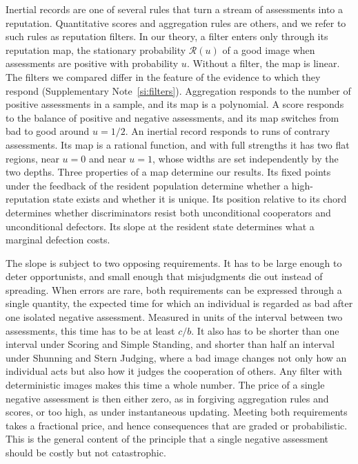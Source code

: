 \documentclass[10pt]{wlscirep}
\newcommand{\Rmap}{\mathscr{R}}            %
\theoremstyle{plain}
\theoremstyle{remark}
\begin{document}
Inertial records are one of several rules that turn a stream of assessments into a reputation. Quantitative scores and aggregation rules are others, and we refer to such rules as reputation filters. In our theory, a filter enters only through its reputation map, the stationary probability $\Rmap(u)$ of a good image when assessments are positive with probability $u$. Without a filter, the map is linear. The filters we compared differ in the feature of the evidence to which they respond (Supplementary Note~\ref{si:filters}). Aggregation responds to the number of positive assessments in a sample, and its map is a polynomial. A score responds to the balance of positive and negative assessments, and its map switches from bad to good around $u=1/2$. An inertial record responds to runs of contrary assessments. Its map is a rational function, and with full strengths it has two flat regions, near $u=0$ and near $u=1$, whose widths are set independently by the two depths. Three properties of a map determine our results. Its fixed points under the feedback of the resident population determine whether a high-reputation state exists and whether it is unique. Its position relative to its chord determines whether discriminators resist both unconditional cooperators and unconditional defectors. Its slope at the resident state determines what a marginal defection costs.

The slope is subject to two opposing requirements. It has to be large enough to deter opportunists, and small enough that misjudgments die out instead of spreading. When errors are rare, both requirements can be expressed through a single quantity, the expected time for which an individual is regarded as bad after one isolated negative assessment. Measured in units of the interval between two assessments, this time has to be at least $c/b$. It also has to be shorter than one interval under Scoring and Simple Standing, and shorter than half an interval under Shunning and Stern Judging, where a bad image changes not only how an individual acts but also how it judges the cooperation of others. Any filter with deterministic images makes this time a whole number. The price of a single negative assessment is then either zero, as in forgiving aggregation rules and scores, or too high, as under instantaneous updating. Meeting both requirements takes a fractional price, and hence consequences that are graded or probabilistic. This is the general content of the principle that a single negative assessment should be costly but not catastrophic.
\end{document}
